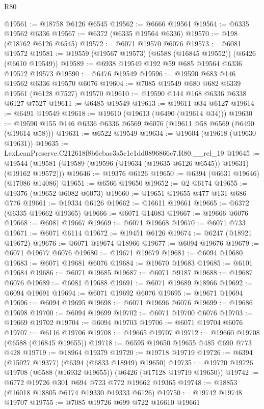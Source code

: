 \begin{lexlean}{R80}
\begin{coremodule}
@19561 := @18758 @6126 @6545
@19562 := @6666 @19561
@19564 := @6335 @19562 @6336
@19567 := @6372 (@6335 @19564 @6336)
@19570 := @198 (@18762 @6126 @6545)
@19572 := @6071 @19570 @6076
@19573 := @6081 @19572
@19581 := @19559 (@19567 @19573) (@6588 (@16845 @19552)) (@6426 (@6610 @19549))
@19589 := @6938 @19549 @192 @59 @685 @19564 @6336 @19572 @19573
@19590 := @6476 @19549
@19596 := @19590 @683 @146 @19562 @6336 @19570 @6076
@19604 := @7085 @19549 @680 @682 @6339 @19561 (@6128 @7527) @19570
@19610 := @19590 @144 @168 @6336 @6338 @6127 @7527
@19611 := @6485 @19549
@19613 := @19611 @34 @6127
@19614 := @6491 @19549
@19618 := @19610 (@19613 (@6490 (@19614 @34)))
@19630 := @19590 @155 @146 @6336 @6336 @6569 @6076 (@19611 @58 @6569 (@6490 (@19614 @58)))
@19631 := @6522 @19549
@19634 := @19604 (@19618 (@19630 @19631))
@19635 := LexLeanPreserve.C212618f8b6ebac3a5c1e1dd0896866e7.R80.__rel_19
@19645 := @19544 (@19581 (@19589 (@19596 (@19634 (@19635 @6126 @6545)) @19631) (@19162 @19572)))
@19646 := @19376 @6126
@19650 := @6394 (@6631 @19646) (@17086 @14086)
@19651 := @6566 @19650
@19652 := @2 @6174
@19655 := @19376 (@19652 @6082 @6073)
@19660 := @19651 @19655 @477 @131 @686 @776
@19661 := @19334 @6126
@19662 := @16611 @19661
@19665 := @6372 (@6335 @19662 @19365)
@19666 := @6071 @14083
@19667 := @19666 @6076
@19668 := @6081 @19667
@19669 := @6071 @19668
@19670 := @6071 @733
@19671 := @6071 @6114
@19672 := @19451 @6126
@19674 := @6247 (@18921 @19672)
@19676 := @6071 @19674 @18966
@19677 := @6094 @19676
@19679 := @6071 @19677 @6076
@19680 := @19671 @19679
@19681 := @6094 @19680
@19683 := @6071 @19681 @6076
@19684 := @19670 @19683
@19685 := @6101 @19684
@19686 := @6071 @19685
@19687 := @6071 @9187
@19688 := @19687 @6076
@19689 := @6081 @19688
@19691 := @6071 @19689 @18966
@19692 := @6094 @19691
@19694 := @6071 @19692 @6076
@19695 := @19671 @19694
@19696 := @6094 @19695
@19698 := @6071 @19696 @6076
@19699 := @19686 @19698
@19700 := @6094 @19699
@19702 := @6071 @19700 @6076
@19703 := @19669 @19702
@19704 := @6094 @19703
@19706 := @6071 @19704 @6076
@19707 := @6116 @19706
@19708 := @19665 @19707
@19712 := @19660 @19708 (@6588 (@16845 @19655))
@19718 := @6595 @19650 @19655 @485 @690 @773 @428
@19719 := @18964 @19379
@19720 := @19718 @19719
@19726 := @6394 (@15027 @19377) (@6394 (@6833 @18949) @19650)
@19735 := @19720 @19726 @19708 (@6588 (@16932 @19655)) (@6426 (@17128 @19719 @19650))
@19742 := @6772 @19726 @301 @694 @723 @772 @19662 @19365
@19748 := @18853 (@16018 @18805 @6174 @19330 @19333 @6126)
@19750 := @19742 @19748 @19707
@19755 := @7085 @19726 @699 @722 @16610 @19661

\end{coremodule}
\end{lexlean}
